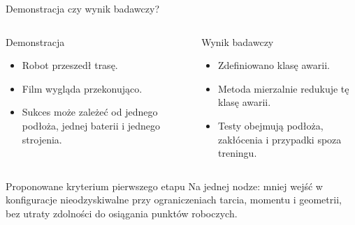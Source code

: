 \begin{frame}{Demonstracja czy wynik badawczy?}
\begin{columns}[T,onlytextwidth]
\begin{block}{Demonstracja}
\begin{itemize}
  \item Robot przeszedł trasę.
  \item Film wygląda przekonująco.
  \item Sukces może zależeć od jednego podłoża, jednej baterii i jednego strojenia.
\end{itemize}
\end{block}
\begin{block}{Wynik badawczy}
\begin{itemize}
  \item Zdefiniowano klasę awarii.
  \item Metoda mierzalnie redukuje tę klasę awarii.
  \item Testy obejmują podłoża, zakłócenia i przypadki spoza treningu.
\end{itemize}
\end{block}
\end{columns}
\vspace{0.4em}
\begin{block}{Proponowane kryterium pierwszego etapu}
Na jednej nodze: mniej wejść w konfiguracje nieodzyskiwalne przy ograniczeniach tarcia, momentu i geometrii, bez utraty zdolności do osiągania punktów roboczych.
\end{block}
\end{frame}

